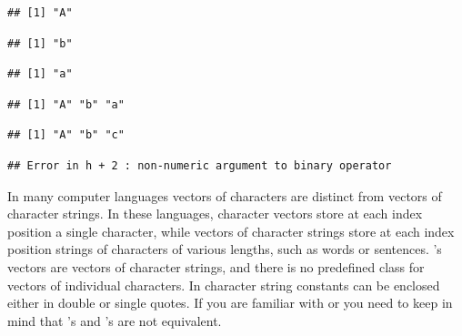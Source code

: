 \documentclass[krantz2]{krantz}\usepackage{knitr}%
\begin{document}
\begin{knitrout}\footnotesize
{}\color{fgcolor}\begin{kframe}
\begin{alltt}
 \hlkwb{<-} 
 \hlkwb{<-} \hlstd{letters[}\hlstd{]}
 \hlkwb{<-} \hlstd{letters[}\hlstd{]}
\end{alltt}
\begin{verbatim}
## [1] "A"
\end{verbatim}
\begin{alltt}
\end{alltt}
\begin{verbatim}
## [1] "b"
\end{verbatim}
\begin{alltt}
\end{alltt}
\begin{verbatim}
## [1] "a"
\end{verbatim}
\begin{alltt}
 \hlkwb{<-} 
\end{alltt}
\begin{verbatim}
## [1] "A" "b" "a"
\end{verbatim}
\begin{alltt}
 \hlkwb{<-}  \hlstd{)}
\end{alltt}
\begin{verbatim}
## [1] "A" "b" "c"
\end{verbatim}
\begin{alltt}
 \hlkwb{<-} 
 \hlopt{+} \hlstd{)}
\end{alltt}
\begin{verbatim}
## Error in h + 2 : non-numeric argument to binary operator
\end{verbatim}
\end{kframe}
\end{knitrout}

\begin{explainbox}
In many computer languages vectors of characters are distinct from vectors of character strings. In these languages, character vectors store at each index position a single character, while vectors of character strings store at each index position strings of characters of various lengths, such as words or sentences. \Rlang's  vectors are vectors of character strings, and there is no predefined class for vectors of individual characters. In \Rlang character string constants can be enclosed either in double or single quotes. If you are familiar with \Clang or \Cpplang you need to keep in mind that \Clang's  and \Rlang's  are not equivalent.
\end{explainbox}
\end{document}
